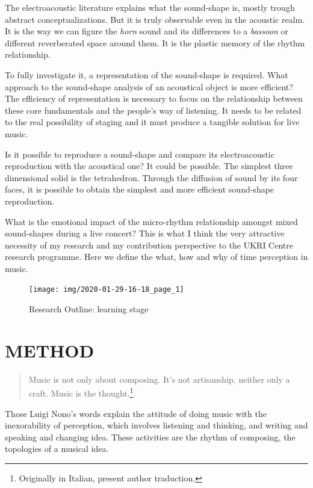 \documentclass[
	a4paper,
	twocolumn
	]{article}
\begin{document}
The electroacoustic literature explains what the sound-shape is, mostly trough abstract conceptualizations. But it is truly observable even in the acoustic realm. It is the way we can figure the \emph{horn} sound and its differences to a \emph{bassoon} or different reverberated space around them. It is the plastic memory of the rhythm relationship.

To fully investigate it, a representation of the sound-shape is required. What approach to the sound-shape analysis of an acoustical object is more efficient? The efficiency of representation is necessary to focus on the relationship between these core fundamentals and the people's way of listening. It needs to be related to the real possibility of staging and it must produce a tangible solution for live music.

Is it possible to reproduce a sound-shape and compare its electroacoustic reproduction with the acoustical one? It could be possible. The simplest three dimensional solid is the tetrahedron. Through the diffusion of sound by its four faces, it is possible to obtain the simplest and more efficient sound-shape reproduction.

What is the emotional impact of the micro-rhythm relationship amongst mixed sound-shapes during a live concert? This is what I think the very attractive necessity of my research and my contribution perspective to the UKRI Centre research programme. Here we define the what, how and why of time perception in music. 

\vfill\null

\begin{figure}[htbp]
\centering
\texttt{[image: img/2020-01-29-16-18\_page\_1]}
\caption{Research Outline: learning stage}
\label{outline}
\end{figure}

\clearpage
\section*{METHOD}

\begin{quote}
Music is not only about composing. It’s not artisanship, neither only a craft. Music is the thought.\footnote{Originally in Italian, present author traduction.}\cite{nono85}.
\end{quote}

Those Luigi Nono's words explain the attitude of doing music with the inexorability of perception, which involves listening and thinking, and writing and speaking and changing idea. These activities are the rhythm of composing, the topologies of a musical idea.
\end{document}
